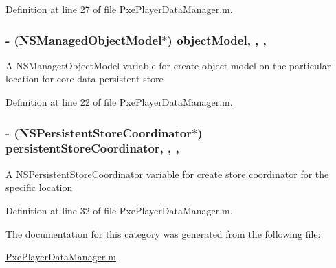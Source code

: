 Definition at line 27 of file Pxe\-Player\-Data\-Manager.\-m.

\hypertarget{category_pxe_player_data_manager_07_08_a6b7bfe044b621bbbaf643632c6dc7e01}{
\subsubsection[{object\-Model}]{\setlength{\rightskip}{0pt plus 5cm}-\/ (N\-S\-Managed\-Object\-Model$\ast$) object\-Model\hspace{0.3cm}{\ttfamily [read]}, {\ttfamily [write]}, {\ttfamily [nonatomic]}, {\ttfamily [strong]}}}\label{category_pxe_player_data_manager_07_08_a6b7bfe044b621bbbaf643632c6dc7e01}
A N\-S\-Managet\-Object\-Model variable for create object model on the particular location for core data persistent store 

Definition at line 22 of file Pxe\-Player\-Data\-Manager.\-m.

\hypertarget{category_pxe_player_data_manager_07_08_affbb8a325d42a3ce9ef30703bc9e7e54}{
\subsubsection[{persistent\-Store\-Coordinator}]{\setlength{\rightskip}{0pt plus 5cm}-\/ (N\-S\-Persistent\-Store\-Coordinator$\ast$) persistent\-Store\-Coordinator\hspace{0.3cm}{\ttfamily [read]}, {\ttfamily [write]}, {\ttfamily [nonatomic]}, {\ttfamily [strong]}}}\label{category_pxe_player_data_manager_07_08_affbb8a325d42a3ce9ef30703bc9e7e54}
A N\-S\-Persistent\-Store\-Coordinator variable for create store coordinator for the specific location 

Definition at line 32 of file Pxe\-Player\-Data\-Manager.\-m.



The documentation for this category was generated from the following file\-:\begin{DoxyCompactItemize}
\item 
\hyperlink{_pxe_player_data_manager_8m}{Pxe\-Player\-Data\-Manager.\-m}\end{DoxyCompactItemize}
